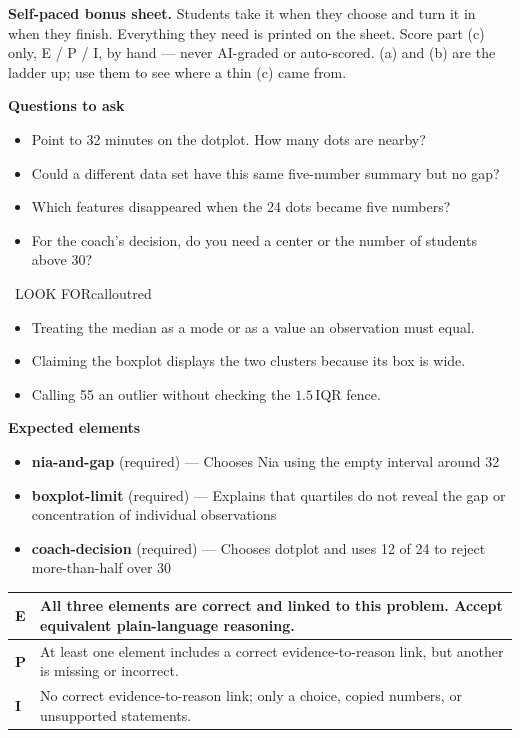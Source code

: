 \documentclass[11pt]{article}
\begin{document}
\textbf{Self-paced bonus sheet.} Students take it when they choose and turn it in when they finish. Everything they need is printed on the sheet. Score part (c) only, E / P / I, by hand --- never AI-graded or auto-scored. (a) and (b) are the ladder up; use them to see where a thin (c) came from.\par

\textbf{Questions to ask}
\begin{itemize}[leftmargin=1.5em,itemsep=2pt,topsep=2pt]
  \item Point to 32 minutes on the dotplot. How many dots are nearby?
  \item Could a different data set have this same five-number summary but no gap?
  \item Which features disappeared when the 24 dots became five numbers?
  \item For the coach's decision, do you need a center or the number of students above 30?
\end{itemize}

\begin{callout}{\IconWarn\ LOOK FOR}{calloutred}
\begin{itemize}[leftmargin=1.5em,itemsep=2pt,topsep=2pt]
  \item Treating the median as a mode or as a value an observation must equal.
  \item Claiming the boxplot displays the two clusters because its box is wide.
  \item Calling 55 an outlier without checking the $1.5\,\mathrm{IQR}$ fence.
\end{itemize}
\end{callout}


\textbf{Expected elements}
\begin{itemize}[leftmargin=1.5em,itemsep=2pt,topsep=2pt]
  \item \textbf{nia-and-gap} (required) --- Chooses Nia using the empty interval around 32
  \item \textbf{boxplot-limit} (required) --- Explains that quartiles do not reveal the gap or concentration of individual observations
  \item \textbf{coach-decision} (required) --- Chooses dotplot and uses 12 of 24 to reject more-than-half over 30
\end{itemize}

{\small\renewcommand{\arraystretch}{1.25}
\noindent\begin{tabular}{|p{0.5in}|p{5.9in}|}
\hline
\textbf{E} & All three elements are correct and linked to this problem. Accept equivalent plain-language reasoning. \\ \hline
\textbf{P} & At least one element includes a correct evidence-to-reason link, but another is missing or incorrect. \\ \hline
\textbf{I} & No correct evidence-to-reason link; only a choice, copied numbers, or unsupported statements. \\ \hline
\end{tabular}}
\end{document}
